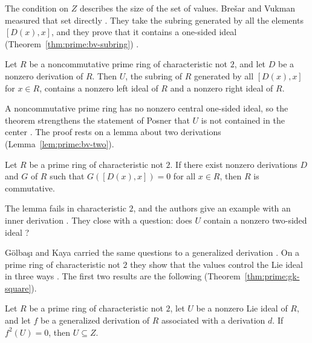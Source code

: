 The condition on $Z$ describes the size of the set of values. Bre\v{s}ar and Vukman
measured that set directly \cite[p.~133]{BresarVukman1993}. They take the subring
generated by all the elements $[D(x),x]$, and they prove that it contains a
one-sided ideal (Theorem~\ref{thm:prime:bv-subring}) \cite[p.~133]{BresarVukman1993}.

\begin{theorem}\label{thm:prime:bv-subring}
Let $R$ be a noncommutative prime ring of characteristic not $2$, and let $D$ be a
nonzero derivation of $R$. Then $U$, the subring of $R$ generated by all
$[D(x),x]$ for $x\in R$, contains a nonzero left ideal of $R$ and a nonzero right
ideal of $R$.
\end{theorem}

A noncommutative prime ring has no nonzero central one-sided ideal, so the theorem
strengthens the statement of Posner that $U$ is not contained in the center
\cite[p.~133]{BresarVukman1993}. The proof rests on a lemma about two derivations (Lemma~\ref{lem:prime:bv-two}).

\begin{lemma}\label{lem:prime:bv-two}
Let $R$ be a prime ring of characteristic not $2$. If there exist nonzero
derivations $D$ and $G$ of $R$ such that $G([D(x),x])=0$ for all $x\in R$, then $R$
is commutative.
\end{lemma}

The lemma fails in characteristic $2$, and the authors give an example with an
inner derivation \cite[p.~134]{BresarVukman1993}. They close with a question: does
$U$ contain a nonzero two-sided ideal \cite[p.~141]{BresarVukman1993}?

G\"olba\c{s}{\i} and Kaya carried the same questions to a generalized derivation
\cite[p.~862]{GolbasiKaya2006}. On a prime ring of characteristic not $2$ they show
that the values control the Lie ideal in three ways
\cite[Theorem~1, p.~864]{GolbasiKaya2006}. The first two results are the following (Theorem~\ref{thm:prime:gk-square}).

\begin{theorem}\label{thm:prime:gk-square}
Let $R$ be a prime ring of characteristic not $2$, let $U$ be a nonzero Lie ideal
of $R$, and let $f$ be a generalized derivation of $R$ associated with a derivation
$d$. If $f^{2}(U)=0$, then $U\subseteq Z$.
\end{theorem}

